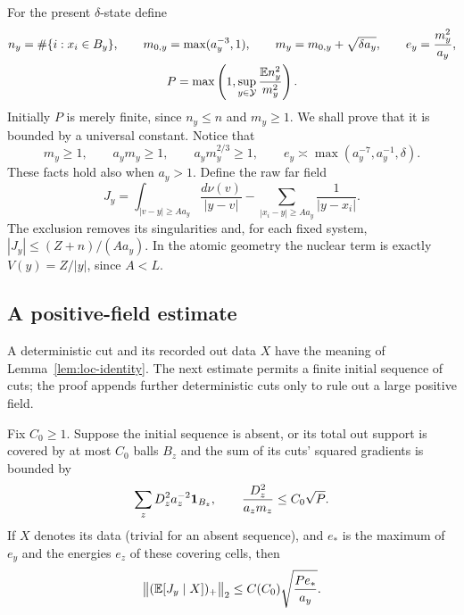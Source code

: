 For the present $\delta$-state define
\begin{equation}\label{m:eq:screen-count-normalization}
 \begin{gathered}
 n_y=\#\{i:x_i\in B_y\},\qquad
 m_{0,y}=\max(a_y^{-3},1),\qquad
 m_y=m_{0,y}+\sqrt{\delta a_y},\qquad e_y=\frac{m_y^2}{a_y},\\
 P=\max\left(1,\sup_{y\in\mathcal Y}\frac{\mathbb E n_y^2}{m_y^2}\right).
 \end{gathered}
\end{equation}
Initially $P$ is merely finite, since $n_y\le n$ and $m_y\ge1$.
We shall prove that it is bounded by a universal constant.  Notice that
\begin{equation}\label{m:eq:screen-normalization-inequalities}
 m_y\ge1,\qquad a_y m_y\ge1,\qquad a_y m_y^{2/3}\ge1,
 \qquad e_y\asymp\max(a_y^{-7},a_y^{-1},\delta).
\end{equation}
These facts hold also when $a_y>1$.
Define the raw far field
\begin{equation}\label{m:eq:screen-raw-field}
 J_y=\int_{|v-y|\ge Aa_y}\frac{d\nu(v)}{|y-v|}
       -\sum_{|x_i-y|\ge Aa_y}\frac1{|y-x_i|}.
\end{equation}
The exclusion removes its singularities and, for each fixed system,
$|J_y|\le (Z+n)/(Aa_y)$.  In the atomic geometry the nuclear
term is exactly $V(y)=Z/|y|$, since $A<L$.

\subsection{A positive-field estimate}

A deterministic cut and its recorded out data $X$ have the meaning of
Lemma~\ref{lem:loc-identity}.  The next estimate permits a finite initial sequence of cuts;
the proof appends further deterministic cuts only to rule out a large
positive field.

\begin{lemma}\label{m:lem:screen-positive-field}\label{a:lem:screen-provisional}
Fix $C_0\ge1$. Suppose the initial sequence is absent, or its total out support is covered by at
most $C_0$ balls $B_z$ and the sum of its cuts' squared gradients is bounded by
\[
 \sum_z D_z^2a_z^{-2}\mathbf 1_{B_z},
 \qquad \frac{D_z^2}{a_zm_z}\le C_0\sqrt P.
\]
If $X$ denotes its data (trivial for an absent sequence), and $e_*$ is the
maximum of $e_y$ and the energies $e_z$ of these covering cells, then
\begin{equation}\label{m:eq:screen-positive}
 \big\|(\mathbb E[J_y\mid X])_+\big\|_2
       \le C(C_0)\sqrt{\frac{P e_*}{a_y}}.
\end{equation}
\end{lemma}

